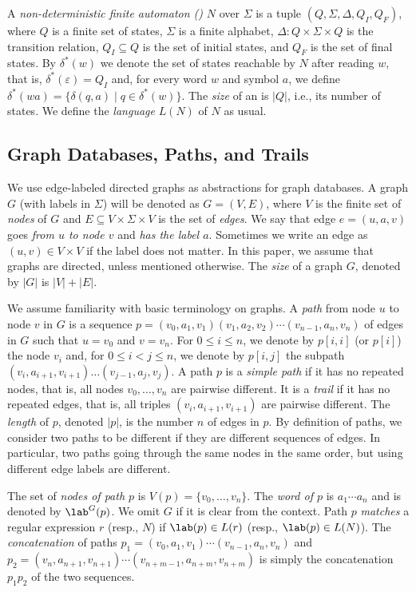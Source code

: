 \documentclass[a4paper,english]{lipics-v2016}
\theoremstyle{plain}
\begin{document}
A \emph{non-deterministic finite automaton (\nfa)} $N$
over $\Sigma$ is a tuple $(Q,\Sigma, \Delta, Q_I ,Q_F)$, where $Q$ is a
finite set of states, $\Sigma$ is a finite alphabet, $\Delta: Q \times
\Sigma \times Q$ is the transition relation, $Q_I \subseteq Q$ is the
set of initial
states, and $Q_F$ is the set of final states. By $\delta^*(w)$ we
denote the set of states reachable by $N$ after reading $w$, that is,
$\delta^*(\varepsilon) = Q_I$ and, for every word $w$ and symbol $a$,
we define $\delta^*(wa) = \{\delta(q,a) \mid q
\in \delta^*(w)\}$.
The \emph{size} of an
\nfa is $|Q|$, i.e., its number of states. 
We define the \emph{language} $L(N)$ of $N$ as usual.

\subsection{Graph Databases, Paths, and Trails}
We use edge-labeled directed graphs as abstractions for graph
databases. A graph $G$ (with labels in $\Sigma$) will be denoted as $G
= (V,E)$, where $V$ is the finite set of \emph{nodes} of $G$ and $E \subseteq
V \times \Sigma \times V$ is the set of \emph{edges}. We say that edge
$e = (u,a,v)$ goes \emph{from $u$ to node $v$} and \emph{has the label
  $a$}. Sometimes we write an edge as $(u,v) \in V\times V$ if the
label does not matter. In this paper, we assume that graphs are
directed, unless mentioned otherwise. The \emph{size} of a graph $G$,
denoted by $|G|$ is $|V|+|E|$.

We assume familiarity with basic terminology on graphs. A \emph{path}
from node $u$ to node $v$ in $G$ is a sequence $p =
(v_0,a_1,v_1)(v_1,a_2,v_2) \cdots (v_{n-1},a_n,v_n)$ of edges in $G$
such that $u = v_0$ and $v = v_n$. For $0 \leq i \leq n$, we denote by
$p[i,i]$ (or $p[i]$) the node $v_i$ and, for $0 \leq i < j \leq n$, we denote by
$p[i,j]$ the subpath $(v_i,a_{i+1},v_{i+1}) \ldots
(v_{j-1},a_{j},v_{j})$. A path $p$ is a \emph{simple path} if it has
no repeated nodes, that is, all nodes $v_0,
\ldots, v_n$ are pairwise different. It is a \emph{trail} if it has no
repeated edges, that is, all triples $(v_i,a_{i+1},v_{i+1})$ are
pairwise different.
    The \emph{length} of
$p$, denoted $|p|$, is the number $n$ of edges in $p$.  By definition
of paths, we consider two paths to be different if they are different
sequences of edges. In particular, two paths going through the same
nodes in the same order, but using different edge labels are
different.

The set of \emph{nodes of path $p$} is $V(p) = \{v_0,\ldots,v_n\}$.
The \emph{word of $p$} is $a_1\cdots a_n$ and is denoted by
$\lab^G(p)$. We omit $G$ if it is clear from the context. Path $p$
\emph{matches} a regular expression $r$ (resp., \nfa $N$) if $\lab(p)
\in L(r)$ (resp., $\lab(p)\in L(N)$).  The \emph{concatenation} of
paths $p_1 = (v_0,a_1,v_1) \cdots (v_{n-1}, a_n, v_n)$ and $p_2 =
(v_n, a_{n+1}, v_{n+1}) \cdots (v_{n+m-1}, a_{n+m}, v_{n+m})$ is
simply the concatenation $p_1 p_2$ of the two sequences. 
\end{document}
